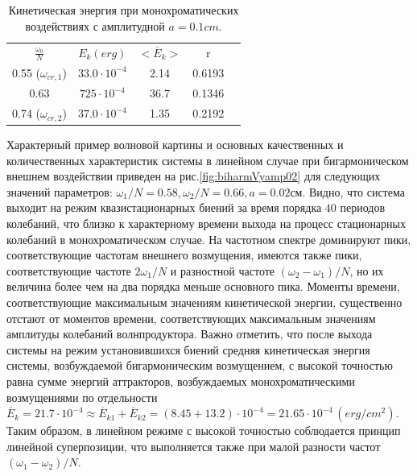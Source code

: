 \begin{table}[h]
	\caption{  Кинетическая энергия при монохроматических воздействиях с амплитудной $a=0.1 cm$. }
	\begin{center}
		\begin{tabular}{|c|c|c|c|c|}
			\hline
			$\displaystyle \frac{\omega_0}{N}$ & $E_k (erg)$ &  $<\overline{E}_{k}>$  & r\\
			0.55 ($\omega_{cr,1}$) & $33.0 \cdot 10^{-4}              $& 2.14  & 0.6193     \\
			0.63                   & $725 \cdot 10^{-4}              $& 36.7  & 0.1346     \\
			0.74 ($\omega_{cr,2}$) & $37.0 \cdot 10^{-4}              $& 1.35  & 0.2192     \\
			\hline
		\end{tabular}
	\end{center}
	\label{tab:bolts01}
\end{table}

Характерный пример волновой картины и основных качественных и количественных характеристик системы в линейном случае при бигармоническом внешнем воздействии приведен на рис.\ref{fig:biharmVyamp02} для следующих значений параметров: $\omega_1/N=0.58, \omega_2/N=0.66, a=0.02$см. Видно, что система выходит на режим квазистационарных биений за время порядка $40$ периодов колебаний, что близко к характерному времени выхода на процесс стационарных колебаний в монохроматическом случае. На частотном спектре доминируют пики, соответствующие частотам внешнего возмущения, имеются также пики, соответствующие частоте  $2\omega_1/N$ и разностной частоте $(\omega_2-\omega_1)/N$, но их величина более чем на два порядка меньше основного пика. Моменты времени, соответствующие максимальным значениям кинетической энергии, существенно отстают от моментов времени, соответствующих максимальным значениям амплитуды колебаний волнпродуктора. Важно отметить, что после выхода системы на режим установившихся биений средняя кинетическая энергия системы, возбуждаемой бигармоническим возмущением, с высокой точностью равна сумме энергий аттракторов, возбуждаемых монохроматическими возмущениями по отдельности $\overline{E}_{k}= { 21.7 \cdot 10^{-4}  }\approx \overline{E}_{k1}+\overline{E}_{k2}= (8.45+13.2) \cdot 10^{-4} = 21.65 \cdot 10^{-4}\, (erg/cm^2) $. Таким образом, в линейном режиме с высокой точностью соблюдается принцип линейной суперпозиции, что выполняется также при малой разности частот $(\omega_1-\omega_2)/N$. 

